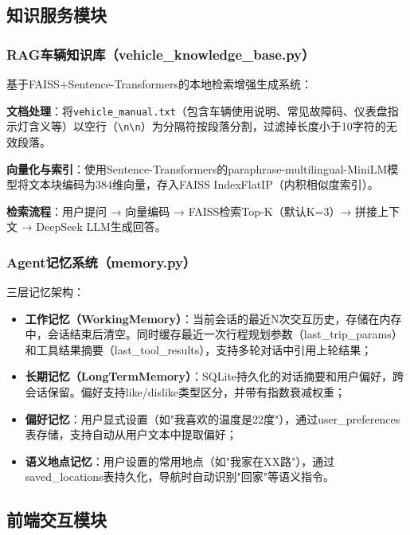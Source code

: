 \documentclass[a4paper]{article}
\begin{document}
\subsection{知识服务模块}

\subsubsection{RAG车辆知识库（vehicle\_knowledge\_base.py）}

基于FAISS+Sentence-Transformers的本地检索增强生成系统：

\textbf{文档处理}：将\texttt{vehicle\_manual.txt}（包含车辆使用说明、常见故障码、仪表盘指示灯含义等）以空行（\texttt{\textbackslash n\textbackslash n}）为分隔符按段落分割，过滤掉长度小于10字符的无效段落。

\textbf{向量化与索引}：使用Sentence-Transformers的paraphrase-multilingual-MiniLM模型将文本块编码为384维向量，存入FAISS IndexFlatIP（内积相似度索引）。

\textbf{检索流程}：用户提问 → 向量编码 → FAISS检索Top-K（默认K=3）→ 拼接上下文 → DeepSeek LLM生成回答。

\subsubsection{Agent记忆系统（memory.py）}

三层记忆架构：

\begin{itemize}
    \item \textbf{工作记忆（WorkingMemory）}：当前会话的最近N次交互历史，存储在内存中，会话结束后清空。同时缓存最近一次行程规划参数（last\_trip\_params）和工具结果摘要（last\_tool\_results），支持多轮对话中引用上轮结果；
    \item \textbf{长期记忆（LongTermMemory）}：SQLite持久化的对话摘要和用户偏好，跨会话保留。偏好支持like/dislike类型区分，并带有指数衰减权重；
    \item \textbf{偏好记忆}：用户显式设置（如"我喜欢的温度是22度"），通过user\_preferences表存储，支持自动从用户文本中提取偏好；
    \item \textbf{语义地点记忆}：用户设置的常用地点（如"我家在XX路"），通过saved\_locations表持久化，导航时自动识别"回家"等语义指令。
\end{itemize}

\subsection{前端交互模块}
\end{document}
